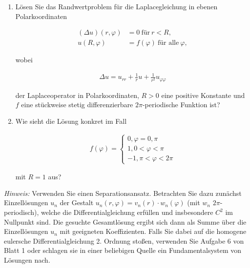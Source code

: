 \begin{exercise}

\phantom{}

\begin{enumerate}[label = (\roman*)]

    \item Lösen Sie das Randwertproblem für die Laplacegleichung in ebenen Polarkoordinaten
    
    \begin{align*}
        (\Delta u)(r, \varphi)
        & =
        0 ~\text{für}~ r < R, \\
        u(R, \varphi)
        & =
        f(\varphi) ~\text{für alle}~ \varphi,
    \end{align*}

    wobei

    \begin{align*}
        \Delta u
        =
        u_{rr} + \frac{1}{r} u + \frac{1}{r^2} u_{\varphi \varphi}
    \end{align*}

    der Laplaceoperator in Polarkoordinaten, $R > 0$ eine positive Konstante und $f$ eine stückweise stetig differenzierbare $2 \pi$-periodische Funktion ist?

    \item Wie sieht die Lösung konkret im Fall
    
    \begin{align*}
        f(\varphi)
        =
        \begin{cases}
            0,  \varphi = 0, \pi \\
            1,  0 < \varphi < \pi \\
            -1, \pi < \varphi < 2 \pi
        \end{cases}
    \end{align*}

    mit $R = 1$ aus?

\end{enumerate}

\textit{Hinweis:}
Verwenden Sie einen Separationsansatz.
Betrachten Sie dazu zunächst Einzellösungen $u_n$ der Gestalt $u_n(r, \varphi) = v_n(r) \cdot w_n(\varphi)$ (mit $w_n$ $2 \pi$-periodisch), welche die Differentialgleichung erfüllen und insbesondere $C^2$ im Nullpunkt sind.
Die gesuchte Gesamtlösung ergibt sich dann als Summe über die Einzellösungen $u_n$ mit geeigneten Koeffizienten.
Falls Sie dabei auf die homogene eulersche Differentialgleichung 2. Ordnung stoßen, verwenden Sie Aufgabe 6 von Blatt 1 oder schlagen sie in einer beliebigen Quelle ein Fundamentalsystem von Lösungen nach.

\end{exercise}

